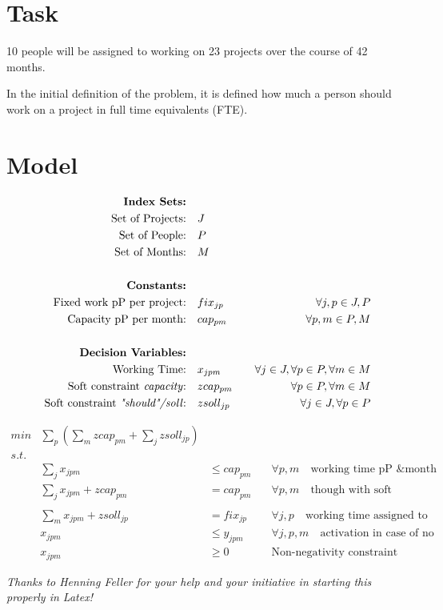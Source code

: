 \section*{Task}

10 people will be assigned to working on 23 projects over the course of 42 months.

In the initial definition of the problem, it is defined how much a person should work on a project in full time equivalents (FTE). 

\section*{Model}

\begin{align*}
    \textbf{Index Sets:}\quad\\
    \text{Set of Projects:}\quad & J \\
    \text{Set of People:}\quad & P \\
    \text{Set of Months:}\quad & M \\
    \\
    \textbf{Constants:}\quad \\
    \text{Fixed work pP per project:}\quad & fix_{jp} \quad & \forall j,p \in J,P\\
    \text{Capacity pP per month:}\quad & cap_{pm} \quad & \forall p,m \in P,M\\
    \\
    \textbf{Decision Variables:}\quad \\
    \text{Working Time:}\quad & x_{jpm} \quad & \forall j \in J, \forall p \in P, \forall m \in M\\
    \text{Soft constraint \textit{capacity}:}\quad & zcap_{pm} \quad & \forall p \in P, \forall m \in M\\
    \text{Soft constraint \textit{"should"/soll}:}\quad & zsoll_{jp} \quad & \forall j \in J, \forall p \in P\\
\end{align*}

\begin{align*}
    min &\sum_p (\sum_m zcap_{pm} + \sum_j zsoll_{jp}) && \\
    s.t. &&&\\
    &\sum_{j} x_{jpm} &\leq cap_{pm} \quad &\forall  p,m \quad \text{working time pP \& month not above their capacity}\\
    &\sum_{j} x_{jpm} + zcap_{pm}&= cap_{pm} \quad &\forall  p,m \quad \text{though with soft constraint}\\
\\
    &\sum_m x_{jpm} + zsoll_{jp} &= fix_{jp} \quad  &\forall j,p \quad \text{working time assigned to project pP w/ soft constr.}\\
   & x_{jpm} &\leq y_{jpm} \quad &\forall  j,p,m \quad\text{activation in case of no contract for month m}\\ 
    &x_{jpm} &\geq 0 \quad &\text{Non-negativity constraint}
\end{align*}

\vspace{2cm}
\noindent\textit{Thanks to Henning Feller for your help and your initiative in starting this properly in Latex!}
